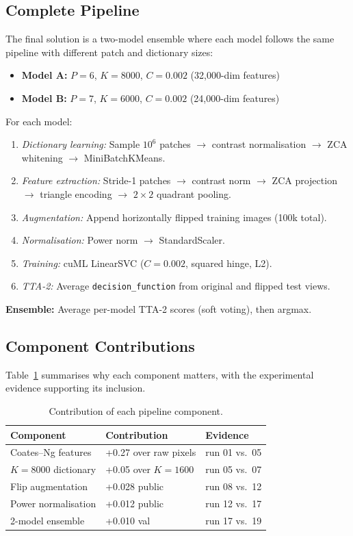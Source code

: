 \documentclass[11pt,a4paper]{article}
\begin{document}
\subsection{Complete Pipeline}

The final solution is a two-model ensemble where each model follows the same
pipeline with different patch and dictionary sizes:

\begin{itemize}[nosep]
  \item \textbf{Model A:} $P = 6$, $K = 8000$, $C = 0.002$ (32,000-dim features)
  \item \textbf{Model B:} $P = 7$, $K = 6000$, $C = 0.002$ (24,000-dim features)
\end{itemize}

For each model:
\begin{enumerate}[nosep]
  \item \textit{Dictionary learning:} Sample $10^6$ patches $\to$ contrast
        normalisation $\to$ ZCA whitening $\to$ MiniBatchKMeans.
  \item \textit{Feature extraction:} Stride-1 patches $\to$ contrast norm
        $\to$ ZCA projection $\to$ triangle encoding $\to$ $2 \times 2$
        quadrant pooling.
  \item \textit{Augmentation:} Append horizontally flipped training images
        (100k total).
  \item \textit{Normalisation:} Power norm $\to$ StandardScaler.
  \item \textit{Training:} cuML LinearSVC ($C = 0.002$, squared hinge, L2).
  \item \textit{TTA-2:} Average \texttt{decision\_function} from original and
        flipped test views.
\end{enumerate}

\noindent\textbf{Ensemble:} Average per-model TTA-2 scores (soft voting),
then argmax.

\subsection{Component Contributions}

Table~\ref{tab:contributions} summarises why each component matters, with
the experimental evidence supporting its inclusion.

\begin{table}[H]
\centering
\caption{Contribution of each pipeline component.}
\label{tab:contributions}
\begin{tabular}{@{}lll@{}}
\toprule
Component & Contribution & Evidence \\
\midrule
Coates--Ng features & +0.27 over raw pixels & run 01 vs.\ 05 \\
$K\!=\!8000$ dictionary & +0.05 over $K\!=\!1600$ & run 05 vs.\ 07 \\
Flip augmentation & +0.028 public & run 08 vs.\ 12 \\
Power normalisation & +0.012 public & run 12 vs.\ 17 \\
2-model ensemble & +0.010 val & run 17 vs.\ 19 \\
\bottomrule
\end{tabular}
\end{table}
\end{document}
